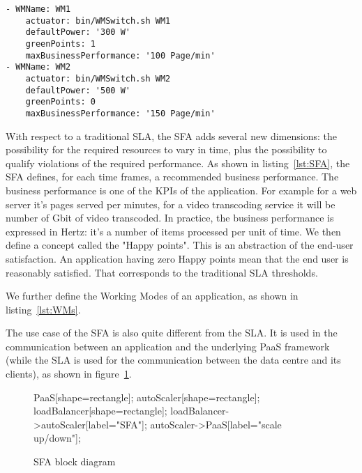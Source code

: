 \begin{lstlisting}[caption={Working Modes definition}, label={lst:WMs}]
- WMName: WM1
    actuator: bin/WMSwitch.sh WM1
    defaultPower: '300 W'
    greenPoints: 1
    maxBusinessPerformance: '100 Page/min'
- WMName: WM2
    actuator: bin/WMSwitch.sh WM2
    defaultPower: '500 W'
    greenPoints: 0
    maxBusinessPerformance: '150 Page/min'

\end{lstlisting}

With respect to a traditional SLA, the SFA adds several new dimensions: the possibility for the required resources to vary in time, plus the possibility to qualify violations of the required performance.
As shown in listing~\ref{lst:SFA}, the SFA defines, for each time frames, a recommended business performance. 
The business performance is one of the KPIs of the application.
For example for a web server it's pages served per minutes, for a video transcoding service it will be number of Gbit of video transcoded.
In practice, the business performance is expressed in Hertz: it's a number of items processed per unit of time.
We then define a concept called the "Happy points".
This is an abstraction of the end-user satisfaction.
An application having zero Happy points mean that the end user is reasonably satisfied.
That corresponds to the traditional SLA thresholds.

We further define the Working Modes of an application, as shown in listing~\ref{lst:WMs}.

The use case of the SFA is also quite different from the SLA. It is used in the communication between an application and the underlying PaaS framework (while the SLA is used for the communication between the data centre and its clients), as shown in figure~\ref{fig:SFABlock}.

\begin{figure}[h]
\label{fig:SFABlock}
\centering
\caption{SFA block diagram}
{
   PaaS[shape=rectangle];
   autoScaler[shape=rectangle];
   loadBalancer[shape=rectangle];
   loadBalancer->autoScaler[label="SFA"];
   autoScaler->PaaS[label="scale up/down"];
}
\end{figure}